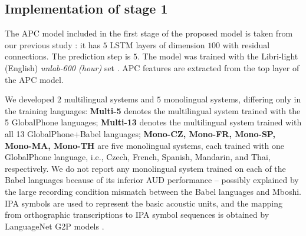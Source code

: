\documentclass[a4paper]{article}
\begin{document}

 

\subsection{Implementation of stage 1}
\label{subsec:setup_stage1}
The APC model included in the first stage of the proposed model is taken from our previous study \cite{feng2020unsupervised}: 
it has $5$ LSTM layers of dimension $100$ with residual connections. The prediction step is $5$. %
The model was trained with the Libri-light (English) \textit{unlab-600 (hour)} set \cite{kahn2019librilight}.
APC features are extracted from the top layer of the APC model.


We developed $2$ multilingual systems and $5$ monolingual systems, differing  only in the training   languages: \textbf{Multi-5} denotes the multilingual system trained with the 5 GlobalPhone languages; \textbf{Multi-13} denotes the multilingual system trained with all 13 GlobalPhone+Babel languages; \textbf{Mono-CZ, Mono-FR, Mono-SP, Mono-MA, Mono-TH} are five monolingual systems, each trained with one GlobalPhone language, i.e., Czech, French, Spanish, Mandarin, and Thai, respectively.
We do not report any monolingual system trained on each of the Babel languages because of its inferior AUD performance -- possibly explained by the large recording condition mismatch  between the Babel languages and Mboshi.
IPA symbols are used to represent the basic acoustic units, and the mapping from  orthographic transcriptions  to IPA symbol sequences is obtained by LanguageNet G2P models \cite{hasegawa2020grapheme}.
\end{document}
